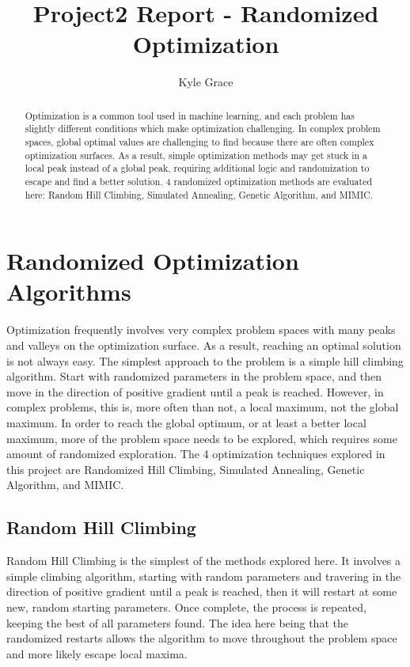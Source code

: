 \documentclass[
	letterpaper, %
]{mlreport}
\author{Kyle Grace}
\title{Project2 Report - Randomized Optimization}
\begin{document}

\maketitle

\begin{abstract}
Optimization is a common tool used in machine learning, and each problem has slightly different conditions which make optimization challenging. In complex problem spaces, global optimal values are challenging to find because there are often complex optimization surfaces. As a result, simple optimization methods may get stuck in a local peak instead of a global peak, requiring additional logic and randomization to escape and find a better solution. 4 randomized optimization methods are evaluated here: Random Hill Climbing, Simulated Annealing, Genetic Algorithm, and MIMIC.
\end{abstract}


\section{Randomized Optimization Algorithms}
Optimization frequently involves very complex problem spaces with many peaks and valleys on the optimization surface. As a result, reaching an optimal solution is not always easy. The simplest approach to the problem is a simple hill climbing algorithm. Start with randomized parameters in the problem space, and then move in the direction of positive gradient until a peak is reached. However, in complex problems, this is, more often than not, a local maximum, not the global maximum. In order to reach the global optimum, or at least a better local maximum, more of the problem space needs to be explored, which requires some amount of randomized exploration. The 4 optimization techniques explored in this project are Randomized Hill Climbing, Simulated Annealing, Genetic Algorithm, and MIMIC.

\subsection{Random Hill Climbing}
Random Hill Climbing is the simplest of the methods explored here. It involves a simple climbing algorithm, starting with random parameters and travering in the direction of positive gradient until a peak is reached, then it will restart at some new, random starting parameters. Once complete, the process is repeated, keeping the best of all parameters found. The idea here being that the randomized restarts allows the algorithm to move throughout the problem space and more likely escape local maxima.
\end{document}

